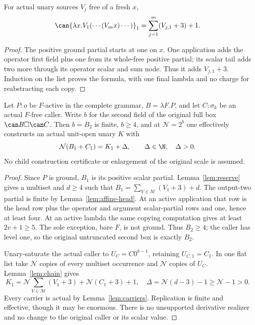 \begin{lemma}\label{lem:chain}
For actual unary sources $V_j$ free of a fresh $x$,
\[
 \can{\lambda x.V_1(\cdots(V_mx)\cdots)}_1
       =\sum_{j=1}^m(V_{j,1}+3)+1.
\]
\end{lemma}
\begin{proof}
The positive ground partial starts at one on $x$.  One application adds
the operator first field plus one from its whole-free positive partial;
its scalar tail adds two more through its operator scalar and sum node.
Thus it adds $V_{j,1}+3$.  Induction on the list proves the formula, with
one final lambda and no charge for reabstracting each copy.
\end{proof}

\begin{theorem}\label{thm:ground-construction}
Let $P:o$ be $F$-active in the complete grammar, $B=\lambda F.P$, and
let $C:\sigma_k$ be an actual $F$-free caller.  Write $b$ for the second
field of the original full box $\can B\square\can C$.
Then $b=B_2$ is finite, $b\ge4$, and at $\mathcal N=2^b$ one effectively
constructs an actual unit-open unary $K$ with
\[
 \mathcal N(B_1+C_1)=K_1+\Delta,\qquad \Delta\in\N,\quad\Delta>0.
\]
No child construction certificate or enlargement of the original scale is
assumed.
\end{theorem}
\begin{proof}
Since $P$ is ground, $B_1$ is its positive scalar partial.  Lemma~\ref{lem:reserve}
gives a multiset and $d\ge4$ such that
$B_1=\sum_{V\in\mathcal M}(V_1+3)+d$.
The output-two partial is finite by Lemma~\ref{lem:affine-head}.  At an
active application that row is the head row plus the operator and argument
scalar-partial rows and one, hence at least four.  At an active lambda the
same copying computation gives at least $2v+1\ge5$.  The sole exception,
bare $F$, is not ground.  Thus $B_2\ge4$; the caller has level one, so
the original untruncated second box is exactly $B_2$.

Unary-saturate the actual caller to $U_C=C0^{k-1}$, retaining $U_{C,1}=C_1$.
In one flat list take $\mathcal N$ copies of every multiset occurrence and
$\mathcal N$ copies of $U_C$.  Lemma~\ref{lem:chain} gives
\[
 K_1=\mathcal N\sum_{V\in\mathcal M}(V_1+3)
             +\mathcal N(C_1+3)+1,
 \quad\Delta=\mathcal N(d-3)-1\ge\mathcal N-1>0.
\]
Every carrier is actual by Lemma~\ref{lem:carriers}.  Replication is finite
and effective, though it may be enormous.  There is no unsupported derivative
realizer and no change to the original caller or its scalar value.
\end{proof}

